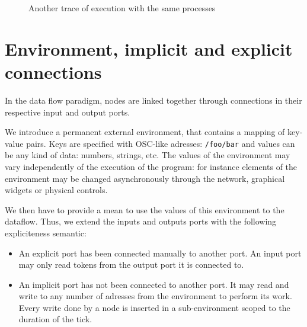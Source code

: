 \documentclass{article}
\begin{document}
    \begin{figure}
        \centering
        \caption{Another trace of execution with the same processes}
        \label{fig.simple-reversed}
    \end{figure}
    
    \section{Environment, implicit and explicit connections}
    In the data flow paradigm, nodes are linked together through connections in their respective input and output ports.
    
    We introduce a permanent external environment, that contains a mapping of key-value pairs.
    Keys are specified with OSC-like\cite{osc} adresses: \lstinline|/foo/bar| and values can be any kind of data: numbers, strings, etc. 
    The values of the environment may vary independently of the execution of the program: for instance elements of the environment may be changed asynchronously through the network, graphical widgets or physical controls.
    
    We then have to provide a mean to use the values of this environment to the dataflow.
    Thus, we extend the inputs and outputs ports with the following expliciteness semantic: 
    
    \begin{itemize}
        \item An explicit port has been connected manually to another port.
        An input port may only read tokens from the output port it is connected to.

        \item An implicit port has not been connected to another port. 
        It may read and write to any number of adresses from the environment to perform its work.
        Every write done by a node is inserted in a sub-environment scoped to the duration of the tick.
    \end{itemize}
    
\end{document}
